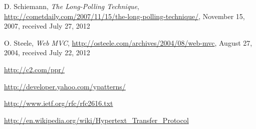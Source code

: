 \begin{thebibliography}{------}
D. Schiemann, \emph{The Long-Polling Technique}, \url{http://cometdaily.com/2007/11/15/the-long-polling-technique/}, November 15, 2007, received July 27, 2012

O. Steele, \emph{Web MVC}, \url{http://osteele.com/archives/2004/08/web-mvc}, August 27, 2004, received July 22, 2012


\url{http://c2.com/ppr/}

\url{http://developer.yahoo.com/ypatterns/}

\url{http://www.ietf.org/rfc/rfc2616.txt}

\url{http://en.wikipedia.org/wiki/Hypertext_Transfer_Protocol}

\end{thebibliography}